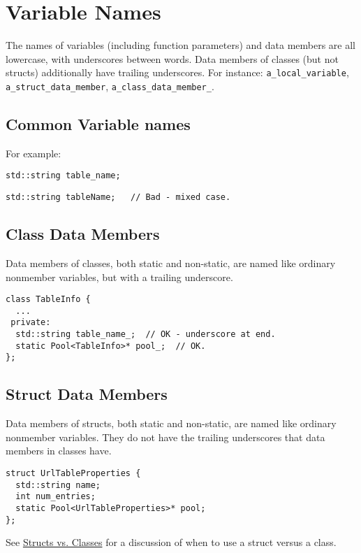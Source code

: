 
\section{Variable Names}\label{sec:variable-names}
The names of variables (including function parameters) and data members are all lowercase, with underscores between words. Data members of classes (but not structs) additionally have trailing underscores. For instance: \texttt{a_local_variable}, \texttt{a_struct_data_member}, \texttt{a_class_data_member_}.


    \subsection{Common Variable names}
    For example:
\begin{verbatim}
std::string table_name;
    \end{verbatim}
    \begin{verbatim}
std::string tableName;   // Bad - mixed case.
    \end{verbatim}
    \subsection{Class Data Members}
    Data members of classes, both static and non-static, are named like ordinary nonmember variables, but with a trailing underscore.
\begin{verbatim}
class TableInfo {
  ...
 private:
  std::string table_name_;  // OK - underscore at end.
  static Pool<TableInfo>* pool_;  // OK.
};
    \end{verbatim}
    \subsection{Struct Data Members}
    Data members of structs, both static and non-static, are named like ordinary nonmember variables. They do not have the trailing underscores that data members in classes have.
\begin{verbatim}
struct UrlTableProperties {
  std::string name;
  int num_entries;
  static Pool<UrlTableProperties>* pool;
};
    \end{verbatim}
    See \hyperref[sec:structs-vs.-classes]{Structs vs. Classes} for a discussion of when to use a struct versus a class.
